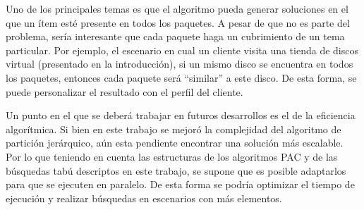 Uno de los principales temas es que el algoritmo pueda generar soluciones en el que un ítem esté presente en todos los paquetes. A pesar de que no es parte del problema, sería interesante que cada paquete haga un cubrimiento de un tema particular. Por ejemplo, el escenario en cual un cliente visita una tienda de discos virtual (presentado en la introducción), si un mismo disco se encuentra en todos los paquetes, entonces cada paquete será "`similar"' a este disco. De esta forma, se puede personalizar el resultado con el perfil del cliente.

Un punto en el que se deberá trabajar en futuros desarrollos es el de la eficiencia algorítmica. Si bien en este trabajo se mejoró la complejidad del algoritmo de partición jerárquico, aún esta pendiente encontrar una solución más escalable. Por lo que teniendo en cuenta las estructuras de los algoritmos PAC y de las búsquedas tabú descriptos en este trabajo, se supone que es posible adaptarlos para que se ejecuten en paralelo. De esta forma se podría optimizar el tiempo de ejecución y realizar búsquedas en escenarios con más elementos.